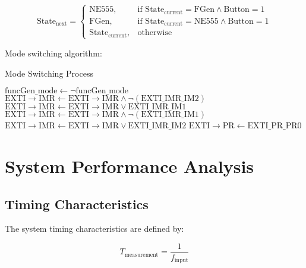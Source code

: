 \documentclass{article}
\begin{document}
\begin{equation}
\text{State}_{\text{next}} = \begin{cases}
\text{NE555}, & \text{if } \text{State}_{\text{current}} = \text{FGen} \land \text{Button} = 1 \\
\text{FGen}, & \text{if } \text{State}_{\text{current}} = \text{NE555} \land \text{Button} = 1 \\
\text{State}_{\text{current}}, & \text{otherwise}
\end{cases}
\end{equation}

Mode switching algorithm:

\begin{algorithm}[H]
\caption{Mode Switching Process}
\begin{algorithmic}[1]
            \State {}
        \EndWhile
        \State $\text{funcGen\_mode} \gets \neg\text{funcGen\_mode}$
            \State $\text{EXTI}\rightarrow\text{IMR} \gets \text{EXTI}\rightarrow\text{IMR} \land \neg(\text{EXTI\_IMR\_IM2})$
            \State $\text{EXTI}\rightarrow\text{IMR} \gets \text{EXTI}\rightarrow\text{IMR} \lor \text{EXTI\_IMR\_IM1}$
        \Else
            \State $\text{EXTI}\rightarrow\text{IMR} \gets \text{EXTI}\rightarrow\text{IMR} \land \neg(\text{EXTI\_IMR\_IM1})$
            \State $\text{EXTI}\rightarrow\text{IMR} \gets \text{EXTI}\rightarrow\text{IMR} \lor \text{EXTI\_IMR\_IM2}$
        \EndIf
    \EndIf
    \State $\text{EXTI}\rightarrow\text{PR} \gets \text{EXTI\_PR\_PR0}$
\EndIf
\end{algorithmic}
\end{algorithm}

\section{System Performance Analysis}
\subsection{Timing Characteristics}

The system timing characteristics are defined by:

\begin{equation}
T_{\text{measurement}} = \frac{1}{f_{\text{input}}}
\end{equation}
\end{document}
